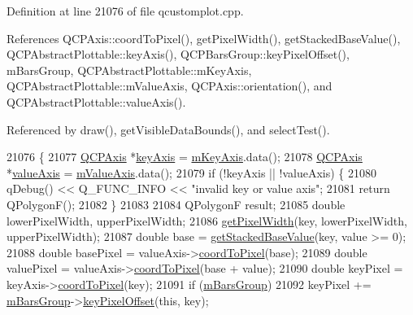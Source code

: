 Definition at line 21076 of file qcustomplot.\+cpp.



References Q\+C\+P\+Axis\+::coord\+To\+Pixel(), get\+Pixel\+Width(), get\+Stacked\+Base\+Value(), Q\+C\+P\+Abstract\+Plottable\+::key\+Axis(), Q\+C\+P\+Bars\+Group\+::key\+Pixel\+Offset(), m\+Bars\+Group, Q\+C\+P\+Abstract\+Plottable\+::m\+Key\+Axis, Q\+C\+P\+Abstract\+Plottable\+::m\+Value\+Axis, Q\+C\+P\+Axis\+::orientation(), and Q\+C\+P\+Abstract\+Plottable\+::value\+Axis().



Referenced by draw(), get\+Visible\+Data\+Bounds(), and select\+Test().


\begin{DoxyCode}
21076                                                                \{
21077   \hyperlink{class_q_c_p_axis}{QCPAxis} *\hyperlink{class_q_c_p_abstract_plottable_a72c7a09c22963f2c943f07112b311103}{keyAxis} = \hyperlink{class_q_c_p_abstract_plottable_a426f42e254d0f8ce5436a868c61a6827}{mKeyAxis}.data();
21078   \hyperlink{class_q_c_p_axis}{QCPAxis} *\hyperlink{class_q_c_p_abstract_plottable_a3106f9d34d330a6097a8ec5905e5b519}{valueAxis} = \hyperlink{class_q_c_p_abstract_plottable_a2901452ca4aea911a1827717934a4bda}{mValueAxis}.data();
21079   \textcolor{keywordflow}{if} (!keyAxis || !valueAxis) \{
21080     qDebug() << Q\_FUNC\_INFO << \textcolor{stringliteral}{"invalid key or value axis"};
21081     \textcolor{keywordflow}{return} QPolygonF();
21082   \}
21083 
21084   QPolygonF result;
21085   \textcolor{keywordtype}{double} lowerPixelWidth, upperPixelWidth;
21086   \hyperlink{class_q_c_p_bars_a794eefe4fb29b9b40583654ccbf460dc}{getPixelWidth}(key, lowerPixelWidth, upperPixelWidth);
21087   \textcolor{keywordtype}{double} base = \hyperlink{class_q_c_p_bars_ae9b0c2fad9f29030c84bb6e62a4b605f}{getStackedBaseValue}(key, value >= 0);
21088   \textcolor{keywordtype}{double} basePixel = valueAxis->\hyperlink{class_q_c_p_axis_a985ae693b842fb0422b4390fe36d299a}{coordToPixel}(base);
21089   \textcolor{keywordtype}{double} valuePixel = valueAxis->\hyperlink{class_q_c_p_axis_a985ae693b842fb0422b4390fe36d299a}{coordToPixel}(base + value);
21090   \textcolor{keywordtype}{double} keyPixel = keyAxis->\hyperlink{class_q_c_p_axis_a985ae693b842fb0422b4390fe36d299a}{coordToPixel}(key);
21091   \textcolor{keywordflow}{if} (\hyperlink{class_q_c_p_bars_a9f59c255f3739182ca9744dff75beaa9}{mBarsGroup})
21092     keyPixel += \hyperlink{class_q_c_p_bars_a9f59c255f3739182ca9744dff75beaa9}{mBarsGroup}->\hyperlink{class_q_c_p_bars_group_a8e2ca6002e7bab49670144d048a2bcc9}{keyPixelOffset}(\textcolor{keyword}{this}, key);

\end{DoxyCode}
